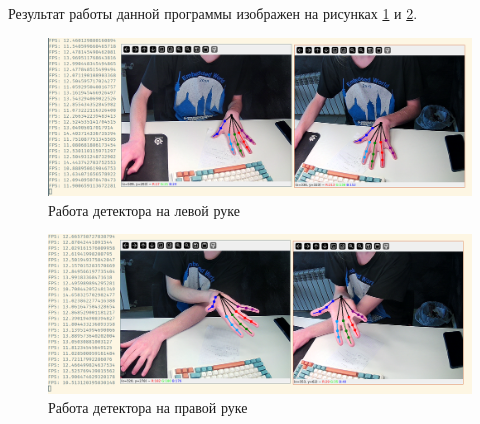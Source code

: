 \documentclass[12pt, a4paper]{article}
\begin{document}
Результат работы данной программы изображен на рисунках \ref{fig:run-detection-screenshots-1} и \ref{fig:run-detection-screenshots-2}.
\begin{figure}[!htb]
  \includegraphics[width=\linewidth]{images/run-detection-screenshots/run-detection-1.png}
  \caption{Работа детектора на левой руке}\label{fig:run-detection-screenshots-1}
\end{figure}
\begin{figure}[!htb]
  \includegraphics[width=\linewidth]{images/run-detection-screenshots/run-detection-2.png}
  \caption{Работа детектора на правой руке}\label{fig:run-detection-screenshots-2}
\end{figure}
\end{document}

